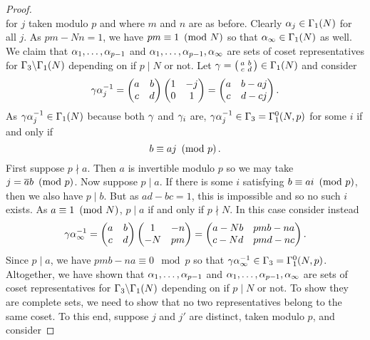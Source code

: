 \begin{proof}
\[      \]
      for $j$ taken modulo $p$ and where $m$ and $n$ are as before. Clearly $\alpha_{j} \in \Gamma_{1}(N)$ for all $j$. As $pm-Nn = 1$, we have $pm \equiv 1 \ \left(\text{mod }N\right)$ so that $\alpha_{\infty} \in \Gamma_{1}(N)$ as well. We claim that $\alpha_{1},\ldots,\alpha_{p-1}$ and $\alpha_{1},\ldots,\alpha_{p-1},\alpha_{\infty}$ are sets of coset representatives for $\Gamma_{3}\backslash\Gamma_{1}(N)$ depending on if $p \mid N$ or not. Let $\gamma = \begin{psmallmatrix} a & b \\ c & d \end{psmallmatrix} \in \Gamma_{1}(N)$ and consider
      \[
        \gamma\alpha_{j}^{-1} = \begin{pmatrix} a & b \\ c & d \end{pmatrix}\begin{pmatrix} 1 & -j \\ 0 & 1 \end{pmatrix} = \begin{pmatrix} a & b-aj \\ c & d-cj \end{pmatrix}.
      \]
      As $\gamma\alpha_{j}^{-1} \in \Gamma_{1}(N)$ because both $\gamma$ and $\gamma_{i}$ are, $\gamma\alpha_{j}^{-1} \in \Gamma_{3} = \Gamma_{1}^{0}(N,p)$ for some $i$ if and only if
      \[
        b \equiv aj \ \left(\text{mod }p\right).
      \]
      First suppose $p \nmid a$. Then $a$ is invertible modulo $p$ so we may take $j = \overline{a}b \ \left(\text{mod }p\right)$. Now suppose $p \mid a$. If there is some $i$ satisfying $b \equiv ai \ \left(\text{mod }p\right)$, then we also have $p \mid b$. But as $ad-bc = 1$, this is impossible and so no such $i$ exists. As $a \equiv 1 \ \left(\text{mod }N\right)$, $p \mid a$ if and only if $p \nmid N$. In this case consider instead
      \[
        \gamma\alpha_{\infty}^{-1} = \begin{pmatrix} a & b \\ c & d \end{pmatrix}\begin{pmatrix} 1 & -n \\ -N & pm \end{pmatrix} = \begin{pmatrix} a-Nb & pmb-na \\ c-Nd & pmd-nc \end{pmatrix}.
      \]
      Since $p \mid a$, we have $pmb-na \equiv 0 \mod{p}$ so that $\gamma\alpha_{\infty}^{-1} \in \Gamma_{3} = \Gamma_{1}^{0}(N,p)$. Altogether, we have shown that $\alpha_{1},\ldots,\alpha_{p-1}$ and $\alpha_{1},\ldots,\alpha_{p-1},\alpha_{\infty}$ are sets of coset representatives for $\Gamma_{3}\backslash\Gamma_{1}(N)$ depending on if $p \mid N$ or not. To show they are complete sets, we need to show that no two representatives belong to the same coset. To this end, suppose $j$ and $j'$ are distinct, taken modulo $p$, and consider

\end{proof}
